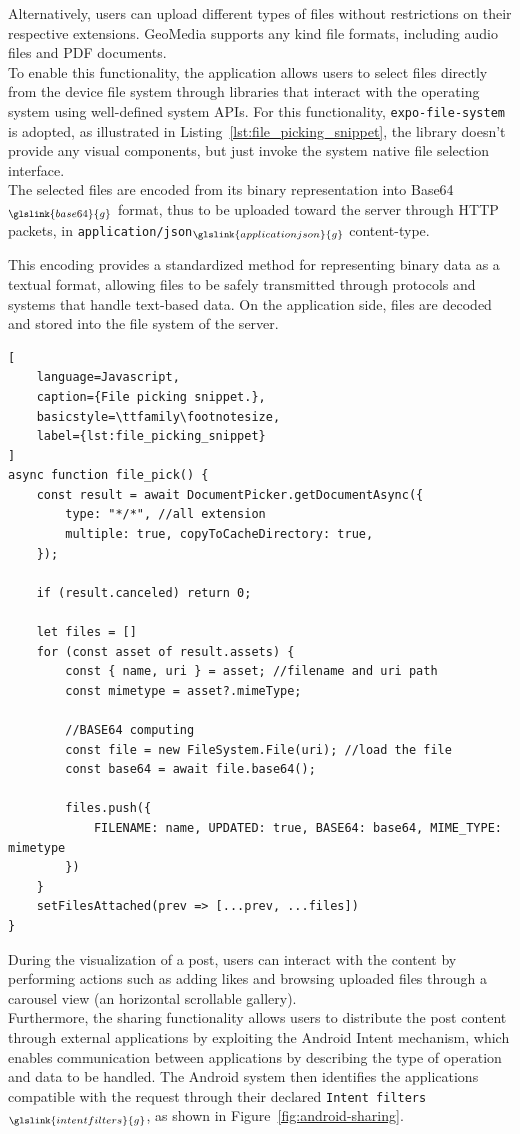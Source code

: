 Alternatively, users can upload different types of files without restrictions on their respective extensions. GeoMedia supports any kind file formats, including audio files and PDF documents. \\
To enable this functionality, the application allows users to select files directly from the device file system through libraries that interact with the operating system using well-defined system APIs. For this functionality, \texttt{expo-file-system} is adopted, as illustrated in Listing~\ref{lst:file_picking_snippet}, the library doesn't provide any visual components, but just invoke the system native file selection interface. \\
The selected files are encoded from its binary representation into Base64$_{\glslink{base64}{g}}$ format, thus to be uploaded toward the server through HTTP packets, in \texttt{application/json}$_{\glslink{applicationjson}{g}}$ content-type.


This encoding provides a standardized method for representing binary data as a textual format, allowing files to be safely transmitted through protocols and systems that handle text-based data. On the application side, files are decoded and stored into the file system of the server.

\newpage

\begin{lstlisting}[
    language=Javascript,
    caption={File picking snippet.},
    basicstyle=\ttfamily\footnotesize,
    label={lst:file_picking_snippet}
]
async function file_pick() {
    const result = await DocumentPicker.getDocumentAsync({
        type: "*/*", //all extension
        multiple: true, copyToCacheDirectory: true,
    });

    if (result.canceled) return 0;

    let files = []
    for (const asset of result.assets) {
        const { name, uri } = asset; //filename and uri path
        const mimetype = asset?.mimeType;

        //BASE64 computing
        const file = new FileSystem.File(uri); //load the file
        const base64 = await file.base64();

        files.push({
            FILENAME: name, UPDATED: true, BASE64: base64, MIME_TYPE: mimetype
        })
    }
    setFilesAttached(prev => [...prev, ...files])
}
\end{lstlisting}


During the visualization of a post, users can interact with the content by performing actions such as adding likes and browsing uploaded files through a carousel view (an horizontal scrollable gallery).\\
Furthermore, the sharing functionality allows users to distribute the post content through external applications by exploiting the Android Intent mechanism, which enables communication between applications by describing the type of operation and data to be handled. The Android system then identifies the applications compatible with the request through their declared \texttt{Intent filters}$_{\glslink{intentfilters}{g}}$, as shown in Figure~\ref{fig:android-sharing}.


